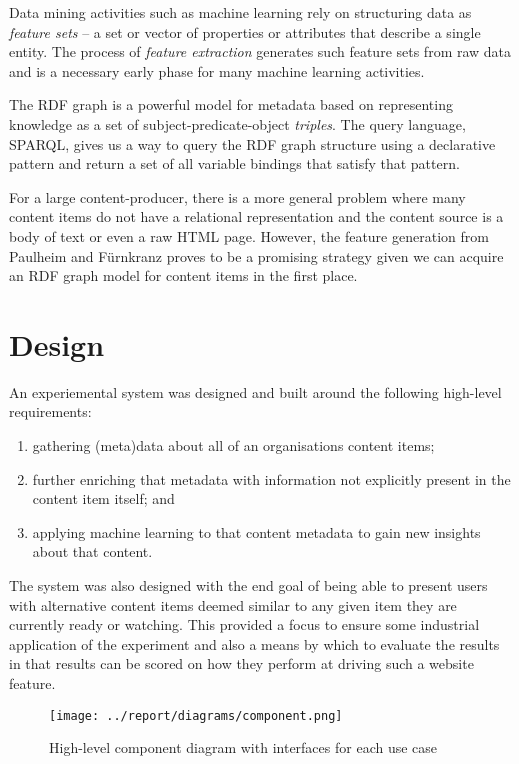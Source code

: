 \documentclass{sig-alternate-05-2015}
\begin{document}
Data mining activities such as machine learning rely on structuring data as
\emph{feature sets}\cite{bishop2006pattern} -- a set or vector of properties or
attributes that describe a single entity.
The process of \emph{feature extraction}
generates such feature sets from raw data and is a necessary early phase for
many machine learning activities.

The RDF graph is a powerful model
for metadata based on representing knowledge as a set of
subject-predicate-object \emph{triples}. The query language, SPARQL, gives us a
way to query the RDF graph structure using a declarative pattern and return a
set of all variable bindings that satisfy that pattern.

For a large content-producer, there is a more general problem where many content
items do not have a relational representation and the content source is a body
of text or even a raw HTML page. However, the feature generation from Paulheim
and F\"urnkranz proves to be a promising strategy given we can acquire an RDF
graph model for content items in the first place.

\section{Design}

An experiemental system was designed and built around the following
high-level requirements:

\begin{enumerate}
\item gathering (meta)data about all of an organisations content items;
\item further enriching that metadata with information not explicitly present
in the content item itself; and
\item applying machine learning to that content metadata to gain new insights
about that content.
\end{enumerate}

The system was also designed with the end goal of being able to present
users with alternative content items deemed similar to any given item they
are currently ready or watching. This provided a focus to ensure some
industrial application of the experiment and also a means by which to evaluate
the results in that results can be scored on how they perform at driving
such a website feature.

\begin{figure}[h]
  \begin{center}
    \texttt{[image: ../report/diagrams/component.png]}
  \end{center}
  \caption{High-level component diagram with interfaces for each use case\label{fig:component}}
\end{figure}
\end{document}
